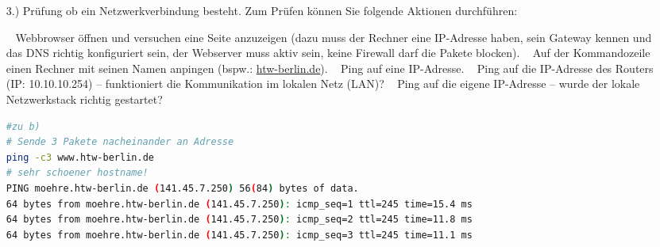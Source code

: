 \documentclass[paper=a4,fontsize=11pt]{scrartcl}%
\numberwithin{equation}{section}
\begin{document}
\begin{itemize}
	\begin{lstlisting}[style=Bash, language=Bash]
#zu c)
# schauen Sie ebenfalls beim Eintrag von inet 
ip addr show eth0 # in CIDR notation
# bzw direkt unter dem Eintrag netmask:
ifconfig eth0
# fuer fortgeschrittene
ip addr show eht0 | awk '/inet/ {print $2}' # CIDR notation
ifconfig eth0 | awk '/netmask/ {print $4}'
	\end{lstlisting}
		
	\begin{lstlisting}[style=Bash, language=Bash]
#zu d)
# Im Zweifelsfall direkt an den Geraeten - LEDs
# oder: 
netstat -natp
netstat -tulpn
netstat -s
ss -s
	\end{lstlisting}
		
\begin{lstlisting}[style=Bash, language=Bash]
#zu e)
#einfache Loesung - direkt unter dem Eintrag error & dropped:
ifconfig eth0 
#fuer fortgeschrittene
ifconfig eth0 | awk '/errors/ {print $3}'
ifconfig eth0 | awk '/dropped/ {print $3}'
ifconfig | grep -E "^\w|errors.* " | sed 's/pack.*errors:/Errors:/g'
| sed 's/ drop.*//g' | sed 's/HW.*//g'
#Achtung Ein-Zeiler die Single-Quotes muessen angepasst werden
	\end{lstlisting}	
		
	\begin{lstlisting}[style=Bash, language=Bash]
#zu f)
#einfache Loesung - direkt unter dem Eintrag packets & bytes:
ifconfig eth0 
#fuer fortgeschrittene
ifconfig eth0 | awk '/bytes/ {print $0}'
nload
cat /proc/net/dev
netstat -i
cat /sys/class/net/eth0/statistics/rx_bytes
	\end{lstlisting}	
	\item[3.)] Prüfung ob ein Netzwerkverbindung besteht. Zum Prüfen können Sie folgende Aktionen durchführen:
	\begin{tasks}
		\task~ Webbrowser öffnen und versuchen eine Seite anzuzeigen (dazu muss der Rechner eine IP-Adresse
haben, sein Gateway kennen und das DNS richtig konfiguriert sein, der Webserver muss aktiv sein, keine Firewall darf die Pakete blocken).
		\task~ Auf der Kommandozeile einen Rechner mit seinen Namen anpingen (bspw.: \url{htw-berlin.de}).
		\task~ Ping auf eine IP-Adresse.
		\task~ Ping auf die IP-Adresse des Routers (IP: 10.10.10.254) -- funktioniert die Kommunikation im lokalen Netz (LAN)?
		\task~ Ping auf die eigene IP-Adresse -- wurde der lokale Netzwerkstack richtig gestartet?
	\end{tasks}
	\begin{lstlisting}[style=Bash, language=Bash]
#zu b)
# Sende 3 Pakete nacheinander an Adresse
ping -c3 www.htw-berlin.de
# sehr schoener hostname!
PING moehre.htw-berlin.de (141.45.7.250) 56(84) bytes of data.
64 bytes from moehre.htw-berlin.de (141.45.7.250): icmp_seq=1 ttl=245 time=15.4 ms
64 bytes from moehre.htw-berlin.de (141.45.7.250): icmp_seq=2 ttl=245 time=11.8 ms
64 bytes from moehre.htw-berlin.de (141.45.7.250): icmp_seq=3 ttl=245 time=11.1 ms


\end{lstlisting}
\end{itemize}
\end{document}
